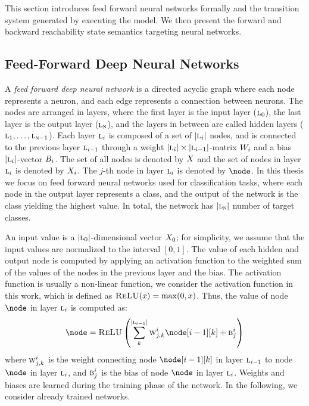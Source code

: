 This section introduces feed forward neural networks formally and the transition system generated by executing the model. We then present the forward and backward reachability state semantics targeting neural networks.

\subsection{Feed-Forward Deep Neural Networks}

A \emph{feed forward deep neural network} is a directed acyclic graph where each node represents a neuron, and each edge represents a connection between neurons.
The nodes are arranged in layers, where the first layer is the input layer ($\textsc{l}_0$), the last layer is the output layer ($\textsc{l}_{\textsc{n}}$), and the layers in between are called hidden layers ($\textsc{l}_{1},\ldots,\textsc{l}_{\textsc{n}-1}$).
Each layer $\textsc{l}_{i}$ is composed of a set of $|\textsc{l}_{i}|$ nodes, and is connected to the previous layer $\textsc{l}_{i-1}$ through a weight $|\textsc{l}_{i}|\times|\textsc{l}_{i-1}|$-matrix $W_{i}$ and a bias $|\textsc{l}_{i}|$-vector $B_{i}$.
The set of all nodes is denoted by $X$ and the set of nodes in layer $\textsc{l}_{i}$ is denoted by $X_{i}$. The $j$-th node in layer $\textsc{l}_{i}$ is denoted by $\node$.
In this thesis we focus on feed forward neural networks used for classification tasks, where each node in the output layer represents a class, and the output of the network is the class yielding the highest value. In total, the network has $|\textsc{l}_{\textsc{n}}|$ number of target classes.

An input value is a $|\textsc{l}_0|$-dimensional vector $X_{0}$; for simplicity, we assume that the input values are normalized to the interval $[0,1]$.
The value of each hidden and output node is computed by applying an activation function to the weighted sum of the values of the nodes in the previous layer and the bias. The activation function is usually a non-linear function, we consider the \relu{} activation function in this work, which is defined as $\textsc{ReLU}(x) = \max(0,x)$. Thus, the value of node $\node$ in layer $\textsc{l}_{i}$ is computed as:
\begin{align*}
  \node = \relu\left(
    \sum_{k}^{\cardinalitynospaces{\hiddenlayer{i-1}}}\weight_{j, k}^{i} \node[i-1][k] + \bias_{j}^{i}
  \right)
\end{align*}
where $\textsc{w}_{j, k}^{i}$ is the weight connecting node $\node[i-1][k]$ in layer $\textsc{l}_{i-1}$ to node $\node$ in layer $\textsc{l}_{i}$, and $\textsc{b}_{j}^{i}$ is the bias of node $\node$ in layer $\textsc{l}_{i}$. Weights and biases are learned during the training phase of the network. In the following, we consider already trained networks.


